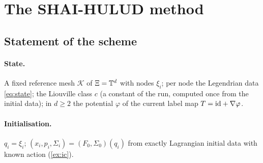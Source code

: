 \section{The SHAI-HULUD method}\label{sec:method}

\subsection{Statement of the scheme}

\paragraph{State.} A fixed reference mesh $\mathcal K$ of $\Xi=\mathbb{T}^d$ with nodes $\xi_i$; per node the Legendrian
data \eqref{eq:state}; the Liouville class $c$ (a constant of the run, computed once from the initial data); in
$d\ge2$ the potential $\varphi$ of the current label map $T=\mathrm{id}+\nabla\varphi$.

\paragraph{Initialisation.} $q_i=\xi_i$; $(x_i,p_i,\Sigma_i)=(F_0,\Sigma_0)(q_i)$ from exactly Lagrangian initial
data with known action (\cref{ex:ic}).

